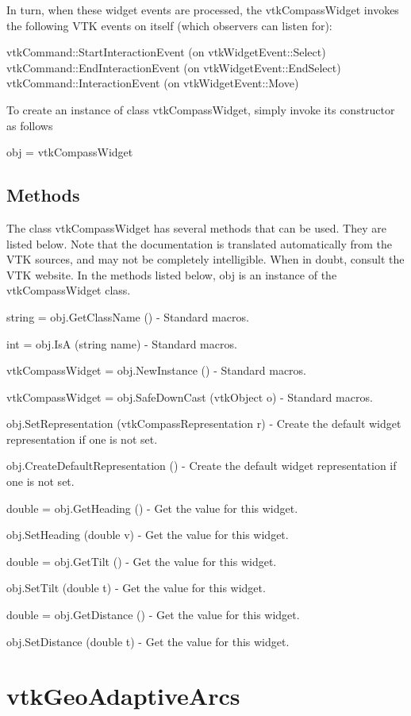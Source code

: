 In turn, when these widget events are processed, the vtk\-Compass\-Widget invokes the following V\-T\-K events on itself (which observers can listen for)\-: 
\begin{DoxyPre}
   vtkCommand::StartInteractionEvent (on vtkWidgetEvent::Select)
   vtkCommand::EndInteractionEvent (on vtkWidgetEvent::EndSelect)
   vtkCommand::InteractionEvent (on vtkWidgetEvent::Move)
 \end{DoxyPre}


To create an instance of class vtk\-Compass\-Widget, simply invoke its constructor as follows \begin{DoxyVerb}  obj = vtkCompassWidget
\end{DoxyVerb}
 \hypertarget{vtkwidgets_vtkxyplotwidget_Methods}{}\subsection{Methods}\label{vtkwidgets_vtkxyplotwidget_Methods}
The class vtk\-Compass\-Widget has several methods that can be used. They are listed below. Note that the documentation is translated automatically from the V\-T\-K sources, and may not be completely intelligible. When in doubt, consult the V\-T\-K website. In the methods listed below, {\ttfamily obj} is an instance of the vtk\-Compass\-Widget class. 
\begin{DoxyItemize}
\item {\ttfamily string = obj.\-Get\-Class\-Name ()} -\/ Standard macros.  
\item {\ttfamily int = obj.\-Is\-A (string name)} -\/ Standard macros.  
\item {\ttfamily vtk\-Compass\-Widget = obj.\-New\-Instance ()} -\/ Standard macros.  
\item {\ttfamily vtk\-Compass\-Widget = obj.\-Safe\-Down\-Cast (vtk\-Object o)} -\/ Standard macros.  
\item {\ttfamily obj.\-Set\-Representation (vtk\-Compass\-Representation r)} -\/ Create the default widget representation if one is not set.  
\item {\ttfamily obj.\-Create\-Default\-Representation ()} -\/ Create the default widget representation if one is not set.  
\item {\ttfamily double = obj.\-Get\-Heading ()} -\/ Get the value for this widget.  
\item {\ttfamily obj.\-Set\-Heading (double v)} -\/ Get the value for this widget.  
\item {\ttfamily double = obj.\-Get\-Tilt ()} -\/ Get the value for this widget.  
\item {\ttfamily obj.\-Set\-Tilt (double t)} -\/ Get the value for this widget.  
\item {\ttfamily double = obj.\-Get\-Distance ()} -\/ Get the value for this widget.  
\item {\ttfamily obj.\-Set\-Distance (double t)} -\/ Get the value for this widget.  
\end{DoxyItemize}\hypertarget{vtkgeovis_vtkgeoadaptivearcs}{}\section{vtk\-Geo\-Adaptive\-Arcs}\label{vtkgeovis_vtkgeoadaptivearcs}
